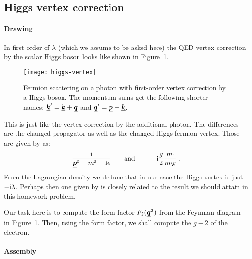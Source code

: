 \documentclass[11pt, english, fleqn, DIV=15, headinclude, BCOR=1cm]{scrartcl}
\begin{document}
\subsection{Higgs vertex correction}

\paragraph{Drawing}

In first order of $\lambda$ (which we assume to be asked here) the QED vertex
correction by the scalar Higgs boson looks like shown in
Figure~\ref{fig:higgs-vertex}.

\begin{figure}[htbp]
    \centering
    \texttt{[image: higgs-vertex]}
    \caption{%
        Fermion scattering on a photon with first-order vertex correction by a
        Higgs-boson. The momentum sums get the following shorter names: $\four
        k' = \four k + \four q$ and $\four q' = \four p - \four k$.
    }
    \label{fig:higgs-vertex}
\end{figure}

This is just like the vertex correction by the additional photon. The
differences are the changed propagator as well as the changed Higgs-fermion
vertex. Those are given by \textcite[(D.49), (D.61)]{romao/aqt} as:
\[
    \frac{\iup}{\four p^2 - m^2 + \iup \epsilon}
    \qquad\text{and}\qquad
    - \iup \frac{g}{2} \frac{m_\mathrm f}{m_\mathrm W} \,.
\]
From the Lagrangian density we deduce that in our case the Higgs vertex is just
$- \mathrm i \lambda$. Perhaps then one given by \textcite{romao/aqt} is closely
related to the result we should attain in this homework problem.

Our task here is to compute the form factor $F_2(\four q^2)$ from the Feynman
diagram in Figure~\ref{fig:higgs-vertex}. Then, using the form factor, we shall
compute the $g - 2$ of the electron.

\paragraph{Assembly}
\end{document}
